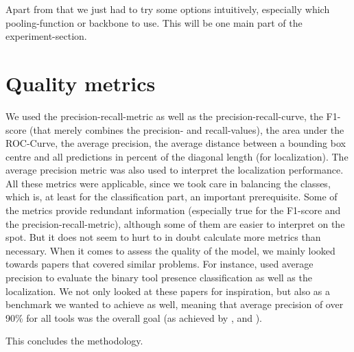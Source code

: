 Apart from that we just had to try some options intuitively, especially which pooling-function or backbone to use. This will be one main part of the experiment-section.

\section{Quality metrics}

We used the precision-recall-metric as well as the precision-recall-curve, the F1-score (that merely combines the precision- and recall-values), the area under the ROC-Curve, the average precision, the average distance between a bounding box centre and all predictions in percent of the diagonal length (for localization). The average precision metric was also used to interpret the localization performance. All these metrics were applicable, since we took care in balancing the classes, which is, at least for the classification part, an important prerequisite. Some of the metrics provide redundant information (especially true for the F1-score and the precision-recall-metric), although some of them are easier to interpret on the spot. But it does not seem to hurt to in doubt calculate more metrics than necessary.
When it comes to assess the quality of the model, we mainly looked towards papers that covered similar problems. For instance, \cite{Vardazaryan} used average precision to evaluate the binary tool presence classification as well as the localization. We not only looked at these papers for inspiration, but also as a benchmark we wanted to achieve as well, meaning that average precision of over 90\% for all tools was the overall goal (as achieved by \cite{Vardazaryan}, \cite{endonet} and \cite{lstm}).

This concludes the methodology.
